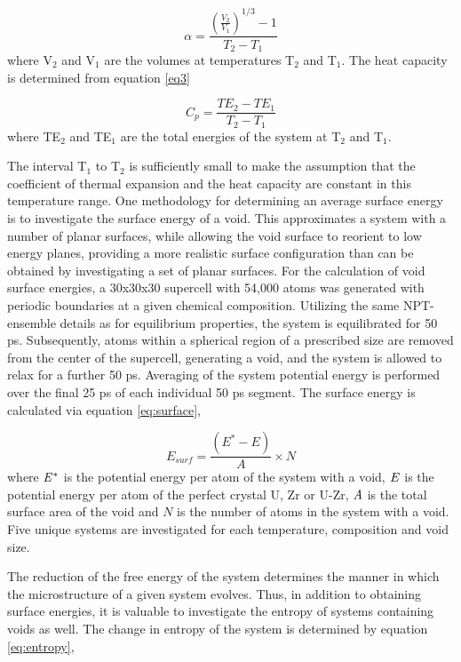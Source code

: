 \documentclass[review]{elsarticle}
\begin{document}
\begin{equation}
\label{eq2}
\alpha= \frac{(\frac{V_2}{V_1})^{1/3} - 1}{T_2-T_1}
\end{equation} where V$_2$ and V$_1$ are the volumes at temperatures T$_2$ and T$_1$. The heat capacity is determined from equation \ref{eq3}

\begin{equation}
\label{eq3}
C_p= \frac{TE_2 - TE_1}{T_2-T_1} 
\end{equation} where TE$_2$ and TE$_1$ are the total energies of the system at T$_2$ and T$_1$. 

The interval T$_1$ to T$_2$ is sufficiently small to make the assumption that the coefficient of thermal expansion and the heat capacity are constant in this temperature range. One methodology for determining an average surface energy is to investigate the surface energy of a void. This approximates a system with a number of planar surfaces, while allowing the void surface to reorient to low energy planes, providing a more realistic surface configuration than can be obtained by investigating a set of planar surfaces. For the calculation of void surface energies, a 30x30x30 supercell with 54,000 atoms was generated with periodic boundaries at a given chemical composition. Utilizing the same NPT-ensemble details as for equilibrium properties, the system is equilibrated for 50 ps. Subsequently, atoms within a spherical region of a prescribed size are removed from the center of the supercell, generating a void, and the system is allowed to relax for a further 50 ps. Averaging of the system potential energy is performed over the final 25 ps of each individual 50 ps segment. The surface energy is calculated via equation \ref{eq:surface},

\begin{equation}
\label{eq:surface}
E_{surf}= \frac{(E^{*} - E)}{A} \times N
\end{equation} where $\it{E^{*}}$ is the potential energy per atom of the system with a void, $\it{E}$ is the potential energy per atom of the perfect crystal U, Zr or U-Zr, $\it{A}$ is the total surface area of the void and $\textit{N}$ is the number of atoms in the system with a void. Five unique systems are investigated for each temperature, composition and void size.

The reduction of the free energy of the system determines the manner in which the microstructure of a given system evolves. Thus, in addition to obtaining surface energies, it is valuable to investigate the entropy of systems containing voids as well. The change in entropy of the system is determined by equation \ref{eq:entropy},
\end{document}
